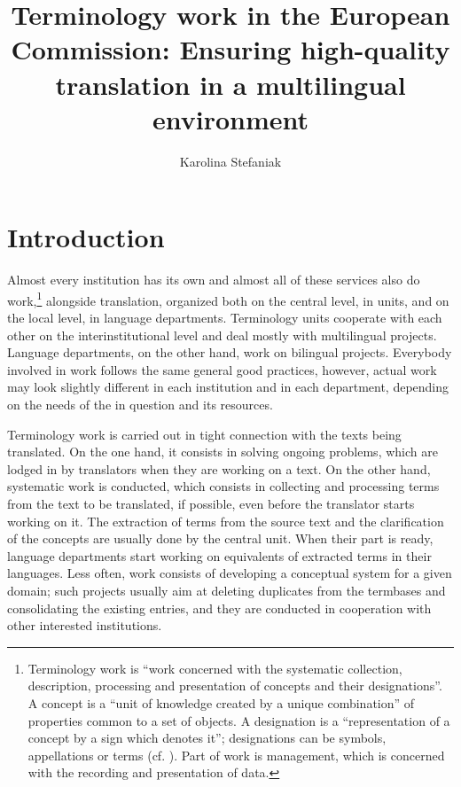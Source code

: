 \documentclass[output=paper]{langsci/langscibook}
\author{Karolina Stefaniak\affiliation{Directorate-General for Translation, European Commission}}
\title{Terminology work in the European Commission: Ensuring high-quality translation in a multilingual environment}
\begin{document}
\section{Introduction}\label{sec:stefaniak:1} 
  

Almost every  institution has its own  and almost all of these services also do  work,\footnote{Terminology work is “work concerned with the systematic collection, description, processing and presentation of concepts and their designations”. A concept is a “unit of knowledge created by a unique combination” of properties common to a set of objects. A designation is a “representation of a concept by a sign which denotes it”; designations can be symbols, appellations or terms (cf. \citeauthor{ISO2000}). Part of  work is  management, which is concerned with the recording and presentation of data.} alongside translation, organized both on the central level, in   units, and on the local level, in language departments. Terminology  units cooperate with each other on the interinstitutional level and deal mostly with multilingual projects. Language departments, on the other hand, work on bilingual projects. Everybody involved in  work follows the same general good practices, however, actual  work may look slightly different in each institution and in each department, depending on the needs of the  in question and its resources.

Terminology work is carried out in tight connection with the texts being translated. On the one hand, it consists in solving ongoing  problems, which are lodged in by translators when they are working on a text. On the other hand, systematic  work is conducted, which consists in collecting and processing terms from the text to be translated, if possible, even before the translator starts working on it. The extraction of terms from the source text and the clarification of the concepts are usually done by the central  unit. When their part is ready, language departments start working on equivalents of extracted terms in their languages. Less often,  work consists of developing a conceptual system for a given domain; such projects usually aim at deleting duplicates from the termbases and consolidating the existing entries, and they are conducted in cooperation with other interested  institutions.
\end{document}
